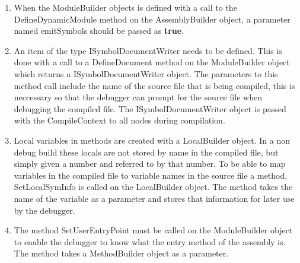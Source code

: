  	\begin{enumerate}
 		\item When the \textsf{ModuleBuilder} objects is defined with a call to 
 		the \textsf{DefineDynamicModule} method on the \textsf{AssemblyBuilder} 
 		object, a parameter named \textsf{emitSymbols} should be passed as 
 		\textbf{true}.
 		
		\item An item of the type \textsf{ISymbolDocumentWriter} needs to be 
		defined. This is done with a call to a \textsf{DefineDocument} method on 
		the \textsf{ModuleBuilder} object which returns a 
		\textsf{ISymbolDocumentWriter} object. The parameters to this method call 
		include the name of the source file that is being compiled, this is 
		neccessary so that the debugger can prompt for the source file when 
		debugging the compiled file. The \textsf{ISymbolDocumentWriter} object is 
		passed with the \textsf{CompileContext} to all nodes during compilation.

		\item Local variables in methods are created with a \textsf{LocalBuilder} 
		object. In a non debug build these locals are not stored by name in the 
		compiled file, but simply given a number and referred to by that number.
		To be able to map variables in the compiled file to variable names in the
		source file a method, \textsf{SetLocalSymInfo} is called on the 
		\textsf{LocalBuilder} object. The method takes the name of the variable as
		a parameter and stores that information for later use by the debugger.
		
		\item The method \textsf{SetUserEntryPoint} must be called on the 
		\textsf{ModuleBuilder} object to enable the debugger to know what the entry
		method of the assembly is. The method takes a \textsf{MethodBuilder} object
		as a parameter.
		

\end{enumerate}
